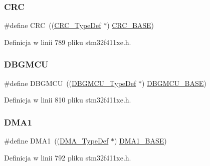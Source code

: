 \subsubsection{\texorpdfstring{C\+RC}{CRC}}
{\footnotesize\ttfamily \#define C\+RC~((\hyperlink{struct_c_r_c___type_def}{C\+R\+C\+\_\+\+Type\+Def} $\ast$) \hyperlink{group___peripheral__memory__map_ga656a447589e785594cbf2f45c835ad7e}{C\+R\+C\+\_\+\+B\+A\+SE})}



Definicja w linii 789 pliku stm32f411xe.\+h.

\mbox{\label{group___peripheral__declaration_ga92ec6d9ec2251fda7d4ce09748cd74b4}} 
\subsubsection{\texorpdfstring{D\+B\+G\+M\+CU}{DBGMCU}}
{\footnotesize\ttfamily \#define D\+B\+G\+M\+CU~((\hyperlink{struct_d_b_g_m_c_u___type_def}{D\+B\+G\+M\+C\+U\+\_\+\+Type\+Def} $\ast$) \hyperlink{group___peripheral__memory__map_ga4adaf4fd82ccc3a538f1f27a70cdbbef}{D\+B\+G\+M\+C\+U\+\_\+\+B\+A\+SE})}



Definicja w linii 810 pliku stm32f411xe.\+h.

\mbox{\label{group___peripheral__declaration_gacc16d2a5937f7585320a98f7f6b578f9}} 
\subsubsection{\texorpdfstring{D\+M\+A1}{DMA1}}
{\footnotesize\ttfamily \#define D\+M\+A1~((\hyperlink{struct_d_m_a___type_def}{D\+M\+A\+\_\+\+Type\+Def} $\ast$) \hyperlink{group___peripheral__memory__map_gab2d8a917a0e4ea99a22ac6ebf279bc72}{D\+M\+A1\+\_\+\+B\+A\+SE})}



Definicja w linii 792 pliku stm32f411xe.\+h.

\mbox{\label{group___peripheral__declaration_ga61247dd5d594289c404dd8774202dfd8}} 
